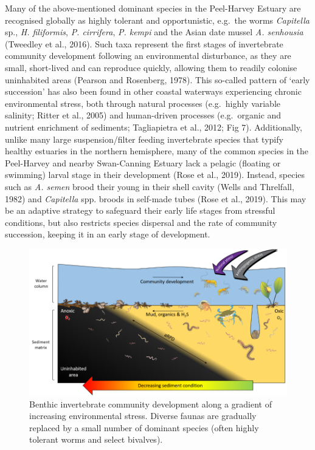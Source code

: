 \documentclass[
]{book}
\begin{document}
Many of the above-mentioned dominant species in the Peel-Harvey Estuary are recognised globally as highly tolerant and opportunistic, e.g.~the worms \emph{Capitella} sp., \emph{H. filiformis}, \emph{P. cirrifera}, \emph{P. kempi} and the Asian date mussel \emph{A. senhousia} (Tweedley et al., 2016). Such taxa represent the first stages of invertebrate community development following an environmental disturbance, as they are small, short-lived and can reproduce quickly, allowing them to readily colonise uninhabited areas (Pearson and Rosenberg, 1978). This so-called pattern of `early succession' has also been found in other coastal waterways experiencing chronic environmental stress, both through natural processes (e.g.~highly variable salinity; Ritter et al., 2005) and human-driven processes (e.g.~organic and nutrient enrichment of sediments; Tagliapietra et al., 2012; Fig 7). Additionally, unlike many large suspension/filter feeding invertebrate species that typify healthy estuaries in the northern hemisphere, many of the common species in the Peel-Harvey and nearby Swan-Canning Estuary lack a pelagic (floating or swimming) larval stage in their development (Rose et al., 2019). Instead, species such as \emph{A. semen} brood their young in their shell cavity (Wells and Threlfall, 1982) and \emph{Capitella} spp. broods in self-made tubes (Rose et al., 2019). This may be an adaptive strategy to safeguard their early life stages from stressful conditions, but also restricts species dispersal and the rate of community succession, keeping it in an early stage of development.

\begin{figure}
\includegraphics[width=1\linewidth]{images/BMI/picture9} \caption{Benthic invertebrate community development along a gradient of increasing environmental stress. Diverse faunas are gradually replaced by a small number of dominant species (often highly tolerant worms and select bivalves).}\label{fig:BMI-pic9}
\end{figure}
\end{document}
